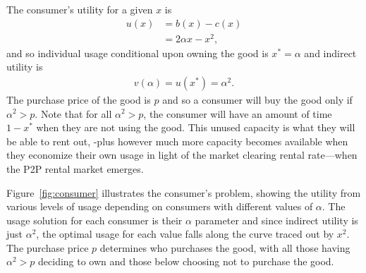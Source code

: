 \documentclass[11pt]{article}
\begin{document}
The consumer's utility for a given $x$ is 
\begin{align}
  u(x) &= b(x) - c(x) \nonumber  \\
       & = 2 \alpha x - x^2,  
\end{align} 
and so individual usage conditional upon owning the good is $x^* = \alpha$ and indirect utility is 
\begin{align}
v(\alpha) = u(x^*) = \alpha^2.  
\end{align} 
The purchase price of the good is $p$ and so a consumer will buy the good only if $\alpha^2 > p$. 
Note that for all $\alpha^2 > p$, the consumer will have an amount of time $1 - x^*$ when they are not using the good.
This unused capacity is what they will be able to rent out, -plus however much more capacity becomes available when they economize their own usage in light of the market clearing rental rate---when the P2P rental market emerges. 

Figure~\ref{fig:consumer} illustrates the consumer's problem, showing the utility from various levels of usage depending on consumers with different values of $\alpha$.
The usage solution for each consumer is their $\alpha$ parameter and since indirect utility is just $\alpha^2$, the optimal usage for each value falls along the curve traced out by $x^2$.
The purchase price $p$ determines who purchases the good, with all those having $\alpha^2 > p$ deciding to own and those below choosing not to purchase the good. 

\pgfmathsetmacro{\xstarOne}{\alphaOne}%
%

\pgfmathsetmacro{\xstarTwo}{\alphaTwo}%
%

\pgfmathsetmacro{\xstarThree}{\alphaThree}%
%
\end{document}
